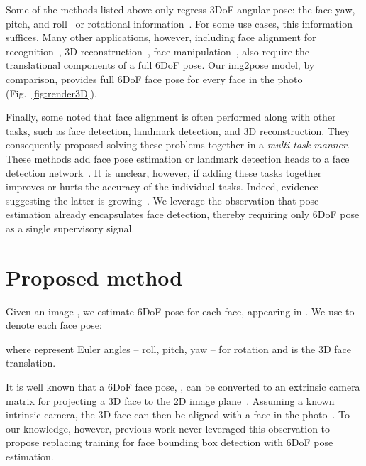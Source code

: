 \documentclass[final]{cvpr}
\begin{document}
Some of the methods listed above only regress 3DoF angular pose: the face yaw, pitch, and roll~\cite{hopenet, fsanet} or rotational information~\cite{quatnet}. For some use cases, this information suffices. Many other applications, however, including face alignment for recognition~\cite{hassner2015effective,masi2017rapid,masi2016we,masi2019face,wang2018cosface,wolf2011face}, 3D reconstruction~\cite{feng2018joint, tuan2017regressing,tuan2018extreme}, face manipulation~\cite{nirkin2019fsgan,nirkin2018face,nirkin2020deepfake}, also require the translational components of a full 6DoF pose. Our img2pose model, by comparison, provides full 6DoF face pose for every face in the photo (Fig.~\ref{fig:render3D}). 

Finally, some noted that face alignment is often performed along with other tasks, such as face detection, landmark detection, and 3D reconstruction. They consequently proposed solving these problems together in a {\em multi-task manner}. These methods add face pose estimation or landmark detection heads to a face detection network~\cite{chang2019deep, kepler, hyperface, ranjan2017all, zhu2012face}. It is unclear, however, if adding these tasks together improves or hurts the accuracy of the individual tasks. Indeed, evidence suggesting the latter is growing~\cite{lu2017fully,tran2019transferability,zhao2018modulation}. We leverage the observation that pose estimation already encapsulates face detection, thereby requiring only 6DoF pose as a single supervisory signal.



\section{Proposed method}\label{sec:method}
Given an image , we estimate 6DoF pose for each face,  appearing in . We use  to denote each face pose: 

where  represent Euler angles -- roll, pitch, yaw -- for rotation and  is the 3D face translation. 



It is well known that a 6DoF face pose, , can be converted to an extrinsic camera matrix for projecting a 3D face to the 2D image plane~\cite{forsyth2002computer,szeliski2010computer}. Assuming a known intrinsic camera, the 3D face can then be aligned with a face in the photo~\cite{hassner2013viewing,hassner2015effective}. To our knowledge, however, previous work never leveraged this observation to propose replacing training for face bounding box detection with 6DoF pose estimation. 
\end{document}
